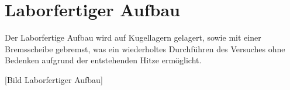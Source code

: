 \section{Laborfertiger Aufbau}

Der Laborfertige Aufbau wird auf Kugellagern gelagert, sowie mit einer Bremsscheibe gebremst, was ein wiederholtes Durchführen des Versuches ohne Bedenken aufgrund der entstehenden Hitze ermöglicht.

[Bild Laborfertiger Aufbau]